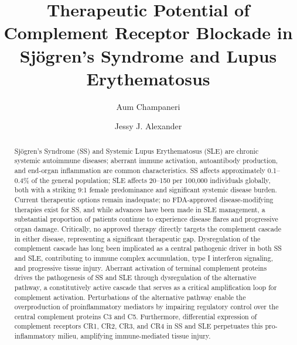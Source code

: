 \documentclass[times, twoside, watermark]{zHenriquesLab-StyleBioRxiv}
\begin{document}
\title{Therapeutic Potential of Complement Receptor Blockade in Sjögren's Syndrome and Lupus Erythematosus}

\author[1]{Aum Champaneri}
\author[1,\Letter]{Jessy J. Alexander}


\maketitle

\begin{abstract}
	Sjögren's Syndrome (SS) and Systemic Lupus Erythematosus (SLE) are chronic systemic autoimmune diseases; aberrant immune activation, autoantibody production, and end-organ inflammation are common characteristics. SS affects approximately 0.1–0.4\% of the general population; SLE affects 20–150 per 100,000 individuals globally, both with a striking 9:1 female predominance and significant systemic disease burden. Current therapeutic options remain inadequate; no FDA-approved disease-modifying therapies exist for SS, and while advances have been made in SLE management, a substantial proportion of patients continue to experience disease flares and progressive organ damage. Critically, no approved therapy directly targets the complement cascade in either disease, representing a significant therapeutic gap.
	Dysregulation of the complement cascade has long been implicated as a central pathogenic driver in both SS and SLE, contributing to immune complex accumulation, type I interferon signaling, and progressive tissue injury. Aberrant activation of terminal complement proteins drives the pathogenesis of SS and SLE through dysregulation of the alternative pathway, a constitutively active cascade that serves as a critical amplification loop for complement activation. Perturbations of the alternative pathway enable the overproduction of proinflammatory mediators by impairing regulatory control over the central complement proteins C3 and C5. Furthermore, differential expression of complement receptors CR1, CR2, CR3, and CR4 in SS and SLE perpetuates this pro-inflammatory milieu, amplifying immune-mediated tissue injury.
\end {abstract}
\end{document}
